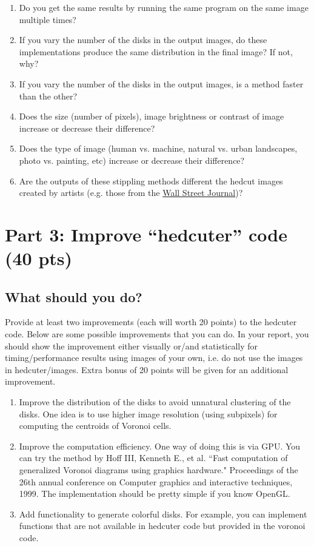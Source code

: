 \documentclass[11pt]{article}
\begin{document}
\begin{enumerate}
\item Do you get the same results by running the same program on the same image multiple times? 
\item If you vary the number of the disks in the output images,  do these implementations produce the same distribution in the final image? If not, why?
\item If you vary the number of the disks in the output images,  is a method faster than the other? 
\item Does the size (number of pixels), image brightness or contrast of image increase or decrease their difference? 
\item Does the type of image (human vs. machine,  natural vs. urban landscapes, photo vs. painting, etc) increase or decrease their difference? 
\item Are the outputs of these stippling methods different  the hedcut images created by artists (e.g. those from the \href{http://www.wsj.com/articles/SB10001424052748704207504575129961786135180}{Wall Street Journal})? 
\end{enumerate}


\section{Part 3: Improve  ``hedcuter'' code (40 pts)}


\subsection{What should  you do?}

Provide at least two improvements (each will worth 20 points) to the hedcuter code. Below are some possible improvements that 
you can do. In your report, you should show the improvement either visually or/and statistically for timing/performance results
using images of your own, i.e. do not use the images in hedcuter/images. 
Extra bonus of 20 points will be given for an additional improvement.
\begin{enumerate}

\item Improve the distribution of the disks to avoid unnatural clustering of the disks. One idea is to use higher
image resolution (using subpixels) for computing the centroids of Voronoi cells. 

\item Improve the computation efficiency. One way of doing this is via GPU. You can try the method by Hoff III, Kenneth E., et al. ``Fast computation of generalized Voronoi diagrams using graphics hardware." Proceedings of the 26th annual conference on Computer graphics and interactive techniques, 1999. The implementation should be pretty simple if you know OpenGL.

\item Add functionality to generate colorful disks. For example, you can implement functions that are not available in hedcuter code but provided in the voronoi code.
\end{enumerate}



\end{document}
